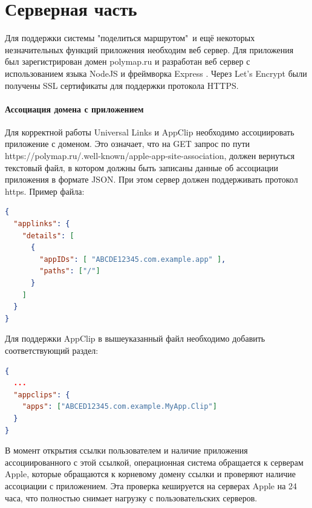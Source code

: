 
\chapter{Серверная часть}
  Для поддержки системы "поделиться маршрутом"\ и ещё некоторых незначительных функций приложения необходим веб сервер. Для приложения был зарегистрирован домен polymap.ru и разработан веб сервер с использованием языка NodeJS \cite{NodeJS} и фреймворка Express \cite{Express}. Через Let's Encrypt \cite{Lets-Encrypt} были получены SSL сертификаты для поддержки протокола HTTPS.

  \subsubsection{Ассоциация домена с приложением}
    Для корректной работы Universal Links и AppClip необходимо ассоциировать приложение с доменом. Это означает, что на GET запрос по пути https://polymap.ru/.well-known/apple-app-site-association, должен вернуться текстовый файл, в котором должны быть записаны данные об ассоциации приложения в формате JSON. При этом сервер должен поддерживать протокол https. Пример файла:

    \begin{lstlisting}[language=json,caption={Файл ассоциации домена с приложением}]
{
  "applinks": {
    "details": [
      {
        "appIDs": [ "ABCDE12345.com.example.app" ],
        "paths": ["/"]
      }
    ]
  }
}
  \end{lstlisting}

    Для поддержки AppClip в вышеуказанный файл необходимо добавить соответствующий раздел:

    \begin{lstlisting}[language=json,caption={Ассоциация домена с AppClip}]
{
  ...
  "appclips": {
    "apps": ["ABCED12345.com.example.MyApp.Clip"]
  }
}
  \end{lstlisting}

    В момент открытия ссылки пользователем и наличие приложения ассоциированного с этой ссылкой, операционная система обращается к серверам Apple, которые обращаются к корневому домену ссылки и проверяют наличие ассоциации с приложением. Эта проверка кешируется на серверах Apple на 24 часа, что полностью снимает нагрузку с пользовательских серверов.


